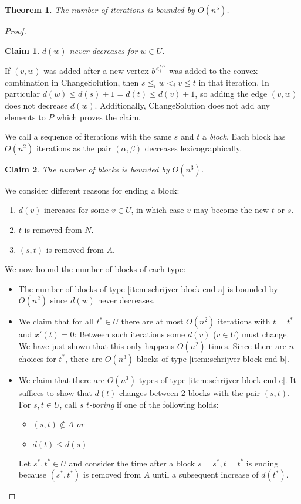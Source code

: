 \documentclass[11pt, a4paper]{article}
\newtheorem{theorem}{Theorem}[section]
\newtheorem*{claim}{Claim}
\theoremstyle{remark}
\theoremstyle{definition}
\begin{document}
\begin{theorem}
	The number of iterations is bounded by $O(n^5)$.
\end{theorem}
\begin{proof}
	\begin{claim}
		$d(w)$ never decreases for $w\in U$.
	\end{claim}
	If $(v,w)$ was added after a new vertex $b^{<_i^{s,u}}$ was added to the
	convex combination in ChangeSolution, then $s\leq_i w<_i v\leq t$ in that
	iteration. In particular $d(w)\leq d(s)+1=d(t)\leq d(v)+1$, so adding
	the edge $(v,w)$ does not decrease $d(w)$. Additionally, ChangeSolution
	does not add any elements to $P$ which proves the claim.

	We call a sequence of iterations with the same $s$ and $t$ a
	\emph{block}. Each block has $O(n^2)$ iterations as the pair
	$(\alpha,\beta)$ decreases lexicographically.
	\begin{claim}
		The number of blocks is bounded by $O(n^3)$.
	\end{claim}
	We consider different reasons for ending a block:
	\begin{enumerate}[label=\alph*)]
		\item\label{item:schrijver-block-end-a}
		$d(v)$ increases for some $v\in U$, in which case $v$ may become the
		new $t$ or $s$.
		\item\label{item:schrijver-block-end-b}
		$t$ is removed from $N$.
		\item\label{item:schrijver-block-end-c}
		$(s,t)$ is removed from $A$.
	\end{enumerate}
	We now bound the number of blocks of each type:
	\begin{itemize}
		\item
		The number of blocks of type \ref{item:schrijver-block-end-a} is bounded
		by $O(n^2)$ since $d(w)$ never decreases.

		\item
		We claim that for all $t^*\in U$ there are at most
		$O(n^2)$ iterations with $t=t^*$ and $x'(t)=0$:
		Between such iterations some $d(v)$ ($v\in U$) must change. We have just
		shown that this only happens $O(n^2)$ times. Since there are $n$ choices
		for $t^*$, there are $O(n^3)$ blocks of type \ref{item:schrijver-block-end-b}.

		\item
		We claim that there are $O(n^3)$ types of type \ref{item:schrijver-block-end-c}.
		It suffices to show that $d(t)$ changes between 2 blocks with the
		pair $(s,t)$. For $s,t\in U$, call $s$ \emph{$t$-boring} if one of
		the following holds:
		\begin{itemize}
			\item $(s,t)\notin A$ \emph{or}
			\item $d(t)\leq d(s)$
		\end{itemize}
		Let $s^*,t^*\in U$ and consider the time after a block $s=s^*,t=t^*$
		is ending because $(s^*,t^*)$ is removed from $A$ until a subsequent
		increase of $d(t^*)$.


\end{itemize}
\end{proof}
\end{document}
